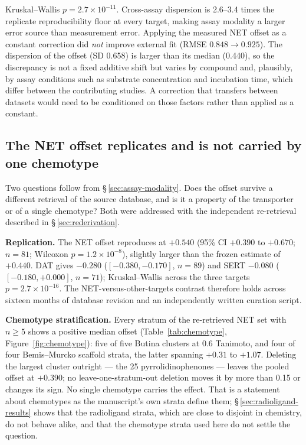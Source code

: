 \documentclass[11pt,a4paper]{article}
\begin{document}
Kruskal--Wallis $p=2.7\times10^{-11}$. Cross-assay dispersion is 2.6--3.4 times the
replicate reproducibility floor at every target, making assay modality a larger error
source than measurement error. Applying the measured NET offset as a constant correction did \emph{not} improve
external fit (RMSE $0.848\rightarrow0.925$). The dispersion of the offset (SD 0.658)
is larger than its median (0.440), so the discrepancy is not a fixed additive shift
but varies by compound and, plausibly, by assay conditions such as substrate
concentration and incubation time, which differ between the contributing studies. A
correction that transfers between datasets would need to be conditioned on those
factors rather than applied as a constant.

\subsection{The NET offset replicates and is not carried by one chemotype}
\label{sec:chemotype}

Two questions follow from \S\,\ref{sec:assay-modality}. Does the offset survive a different retrieval of
the source database, and is it a property of the transporter or of a single
chemotype? Both were addressed with the independent re-retrieval described in
\S\,\ref{sec:rederivation}.

\textbf{Replication.} The NET offset reproduces at $+0.540$ (95\% CI $+0.390$ to
$+0.670$; $n=81$; Wilcoxon $p=1.2\times10^{-8}$), slightly larger than the frozen
estimate of $+0.440$. DAT gives $-0.280$ ($[-0.380,-0.170]$, $n=89$) and SERT
$-0.080$ ($[-0.180,+0.000]$, $n=71$); Kruskal--Wallis across the three targets
$p=2.7\times10^{-16}$. The NET-versus-other-targets contrast therefore holds across
sixteen months of database revision and an independently written curation script.

\textbf{Chemotype stratification.} Every stratum of the re-retrieved NET set with
$n\geq5$ shows a positive median offset (Table~\ref{tab:chemotype},
Figure~\ref{fig:chemotype}): five of five Butina clusters at 0.6 Tanimoto, and four
of four Bemis--Murcko scaffold strata, the latter spanning $+0.31$ to $+1.07$.
Deleting the largest cluster outright --- the 25 pyrrolidinophenones --- leaves the
pooled offset at $+0.390$; no leave-one-stratum-out deletion moves it by more than
0.15 or changes its sign. No single chemotype carries the effect. That is a statement
about chemotypes as the manuscript's own strata define them; \S\,\ref{sec:radioligand-results}
shows that the radioligand strata, which are close to disjoint in chemistry, do not behave
alike, and that the chemotype strata used here do not settle the question.
\end{document}

